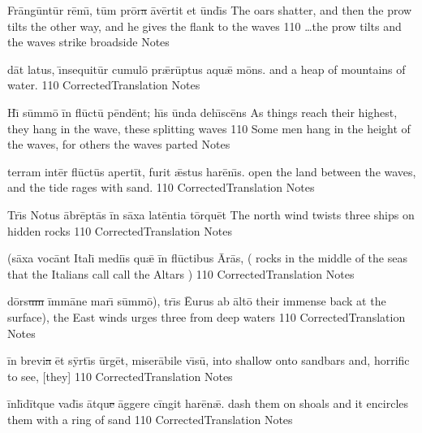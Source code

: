 \latline
  {Fr\=ang\=unt\=ur r\={\macron e}m\={\macron \i}, t\=um pr\={\macron o}r\sout{a }\={\macron a}v\=ert\-it \-et \=und\={\macron \i}s}
  { The oars shatter, and then the prow tilts the other way, and he gives the flank to the waves }
  {110}
  { \ldots the prow tilts and the waves strike broadside }
  { Notes }


\latline
  {d\=at l\-at\-us, \={\macron \i}ns\-equ\-it\=ur c\-um\-ul\={\macron o} pr\={\ae}r\=upt\-us \-aqu\={\ae} m\={\macron o}ns.}
  { and a heap of mountains of water.  }
  {110}
  { CorrectedTranslation }
  { Notes }


\latline
  {H\={\macron \i} s\=umm\={\macron o} \=in fl\={\macron u}ct\={\macron u} p\=end\=ent; h\={\macron \i}s \=und\-a d\-eh\={\macron \i}sc\={\macron e}ns}
  { As things reach their highest, they hang in the wave, these splitting waves }
  {110}
  { Some men hang in the height of the waves, for others the waves parted }
  { Notes }




\latline
  {t\-err\-am \-int\=er fl\={\macron u}ct\={\macron u}s \-ap\-ert\=it, f\-ur\-it \={\ae}st\-us h\-ar\={\macron e}n\={\macron \i}s.}
  { open the land between the waves, and the tide rages with sand. }
  {110}
  { CorrectedTranslation }
  { Notes }


\latline
  {Tr\={\macron \i}s N\-ot\-us \=abr\=ept\={\macron a}s \=in s\=ax\-a l\-at\=ent\-i\-a t\=orqu\=et}
  { The north wind twists three ships on hidden rocks }
  {110}
  { CorrectedTranslation }
  { Notes }


\latline
  {(s\=ax\-a v\-oc\=ant \-It\-al\={\macron \i} m\-edi\={\macron \i}s qu\={\ae} \=in fl\={\macron u}ct\-ib\-us \={\macron A}r\={\macron a}s,}
  { ( rocks in the middle of the seas that the Italians call call the Altars )   }
  {110}
  { CorrectedTranslation }
  { Notes }




\latline
  {d\=ors\sout{um }\=imm\={\macron a}n\-e m\-ar\={\macron \i} s\=umm\={\macron o}), tr\={\macron \i}s \={Eu}r\-us \-ab \=alt\={\macron o}}
  { their immense back at the surface), the East winds urges three from deep waters }
  {110}
  { CorrectedTranslation }
  { Notes }


\latline
  {\=in br\-ev\-i\sout{a }\=et s\=yrt\={\macron \i}s \=urg\=et, m\-is\-er\={\macron a}b\-il\-e v\={\macron \i}s\={\macron u},}
  { into shallow onto sandbars and, horrific to see, [they] }
  {110}
  { CorrectedTranslation }
  { Notes }


\latline
  {\=inl\={\macron \i}d\=itqu\-e v\-ad\={\macron \i}s \=atqu\sout{e }\=agg\-er\-e c\=ing\-it h\-ar\={\macron e}n\={\ae}.}
  { dash them on shoals and it encircles them  with a ring of sand }
  {110}
  { CorrectedTranslation }
  { Notes }




